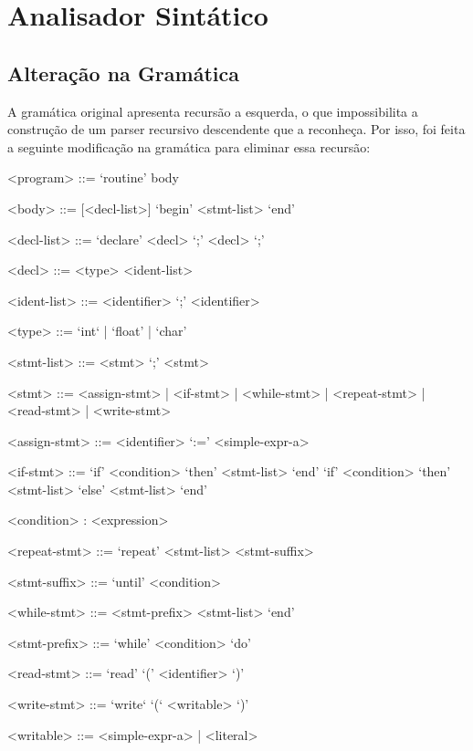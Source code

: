 \chapter{Analisador Sintático}
\label{cap:sintatico}

\section{Alteração na Gramática}
\label{sec:sintaticoAlteracaoGramatica}
A gramática original apresenta recursão a esquerda, o que impossibilita a construção de um parser recursivo descendente que a reconheça.
Por isso, foi feita a seguinte modificação na gramática para eliminar essa recursão:

\begin{grammar}
    
    <program> ::= `routine' body
    
    <body> ::= [<decl-list>] `begin' <stmt-list> `end'
    
    <decl-list> ::= `declare' <decl> `;' {<decl> `;'}
    
    <decl> ::= <type> <ident-list>
    
    <ident-list> ::= <identifier> {`;' <identifier>}
    
    <type> ::= `int` | `float' | `char'
    
    <stmt-list> ::= <stmt> {`;' <stmt>}
    
    <stmt> ::= <assign-stmt> | <if-stmt> | <while-stmt> | <repeat-stmt> | <read-stmt> | <write-stmt>
    
    <assign-stmt> ::= <identifier> `:=' <simple-expr-a>
    
    <if-stmt> ::= `if' <condition> `then' <stmt-list> `end'
                  \alt `if' <condition> `then' <stmt-list> `else' <stmt-list> `end'
                  
    <condition> : <expression>
    
    <repeat-stmt> ::= `repeat' <stmt-list> <stmt-suffix>
    
    <stmt-suffix> ::= `until' <condition>
    
    <while-stmt> ::= <stmt-prefix> <stmt-list> `end'
    
    <stmt-prefix> ::= `while' <condition> `do'
    
    <read-stmt> ::= `read' `(' <identifier> `)'
    
    <write-stmt> ::= `write` `(` <writable> `)'
    
    <writable> ::= <simple-expr-a> | <literal>
    

\end{grammar}
